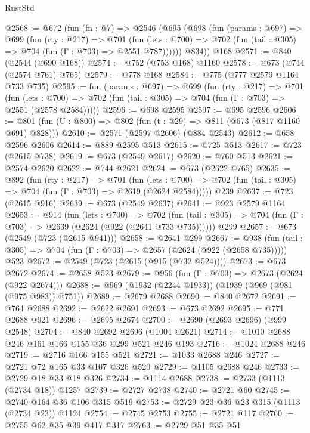 \begin{lexlean}{RustStd}
\begin{coremodule}
{\begin{coremodule}
{{{{{{{{{{@2568 := @672
    (fun (fn : @7) =>
    @2546
      (@695
        (@698
          (fun (params : @697) =>
          @699
            (fun (rty : @217) =>
            @701
              (fun (lets : @700) =>
              @702 (fun (tail : @305) => @704 (fun (Γ : @703) => @2551 @787))))))
        @834))
    @168
@2571 := @840 (@2544 (@690 @168))
@2574 := @752 (@753 @168) @1160
@2578 := @673 (@744 (@2574 @761) @765)
@2579 := @778 @168
@2584 := @775 (@777 @2579 @1164 @733 @735)
@2595 := fun (params : @697) =>
  @699
    (fun (rty : @217) =>
    @701
      (fun (lets : @700) =>
      @702 (fun (tail : @305) => @704 (fun (Γ : @703) => @2551 (@2578 @2584)))))
@2596 := @698 @2595
@2597 := @695 @2596
@2606 := @801 (fun (U : @800) => @802 (fun (t : @29) => @811 (@673 (@817 @1160 @691) @828)))
@2610 := @2571 (@2597 @2606) (@884 @2543)
@2612 := @658 @2596 @2606
@2614 := @889 @2595 @513
@2615 := @725 @513
@2617 := @723 (@2615 @738)
@2619 := @673 (@2549 @2617)
@2620 := @760 @513
@2621 := @2574 @2620
@2622 := @744 @2621
@2624 := @673 (@2622 @765)
@2635 := @892
    (fun (rty : @217) =>
    @701
      (fun (lets : @700) =>
      @702 (fun (tail : @305) => @704 (fun (Γ : @703) => @2619 (@2624 @2584)))))
    @239
@2637 := @723 (@2615 @916)
@2639 := @673 (@2549 @2637)
@2641 := @923 @2579 @1164
@2653 := @914
    (fun (lets : @700) =>
    @702 (fun (tail : @305) => @704 (fun (Γ : @703) => @2639 (@2624 (@922 (@2641 @733 @735))))))
    @299
@2657 := @673 (@2549 (@723 (@2615 @941)))
@2658 := @2641 @299
@2667 := @938 (fun (tail : @305) => @704 (fun (Γ : @703) => @2657 (@2624 (@922 (@2658 @735))))) @523
@2672 := @2549 (@723 (@2615 (@915 (@732 @524))))
@2673 := @673 @2672
@2674 := @2658 @523
@2679 := @956 (fun (Γ : @703) => @2673 (@2624 (@922 @2674)))
@2688 := @969 (@1932 (@2244 @1933)) (@1939 (@969 (@981 (@975 @983)) @751))
@2689 := @2679 @2688
@2690 := @840 @2672
@2691 := @764 @2688
@2692 := @2622 @2691
@2693 := @673 @2692
@2695 := @771 @2688 @921
@2696 := @2695 @2674
@2700 := @2690 (@2693 @2696) (@999 @2548)
@2704 := @840 @2692 @2696 (@1004 @2621)
@2714 := @1010 @2688 @246 @161 @166 @155 @36 @299 @521 @246 @193
@2716 := @1024 @2688 @246
@2719 := @2716 @166 @155 @521
@2721 := @1033 @2688 @246
@2727 := @2721 @72 @165 @33 @107 @326 @520
@2729 := @1105 @2688 @246
@2733 := @2729 @18 @33 @18 @326
@2734 := @1114 @2688
@2738 := @2733 (@1113 (@2734 @18)) @1257
@2739 := @2727 @2738
@2740 := @2721 @60
@2745 := @2740 @164 @36 @106 @315 @519
@2753 := @2729 @23 @36 @23 @315 (@1113 (@2734 @23)) @1124
@2754 := @2745 @2753
@2755 := @2721 @117
@2760 := @2755 @62 @35 @39 @417 @317
@2763 := @2729 @51 @35 @51
}}}}}}}}}}
\end{coremodule}}
\end{coremodule}
\end{lexlean}
